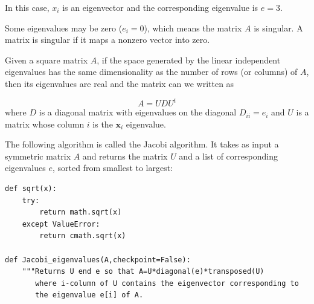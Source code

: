 \documentclass[justified,sixbynine]{tufte-book}
\def\ft{\small\tt}
\theoremstyle{plain}%
\theoremstyle{definition}
\theoremstyle{remark}
\begin{document}
\begin{fullwidth}
In this case, $x_i$ is an eigenvector and the corresponding eigenvalue is $e=3$.

Some eigenvalues may be zero ($e_i=0$), which means the matrix $A$ is singular. A matrix is singular if it maps a nonzero vector into zero.

Given a square matrix $A$, if the space generated by the linear independent eigenvalues has the same dimensionality as the number of rows (or columns) of $A$, then its eigenvalues are real and the matrix can we written as

\begin{equation}
A = U D U^t
\end{equation}
where
$D$ is a diagonal matrix with eigenvalues on the diagonal $D_{ii} = e_i$ and
$U$ is a matrix whose column $i$ is the $\mathbf{x}_i$ eigenvalue.

The following algorithm is called the Jacobi algorithm. It takes as input a symmetric matrix $A$ and returns the matrix $U$ and a list of corresponding eigenvalues $e$, sorted from smallest to largest:


\begin{lstlisting}[caption={in file: {\ft nlib.py}}]
def sqrt(x):
    try:
        return math.sqrt(x)
    except ValueError:
        return cmath.sqrt(x)

def Jacobi_eigenvalues(A,checkpoint=False):
    """Returns U end e so that A=U*diagonal(e)*transposed(U)
       where i-column of U contains the eigenvector corresponding to
       the eigenvalue e[i] of A.


\end{lstlisting}
\end{fullwidth}
\end{document}
